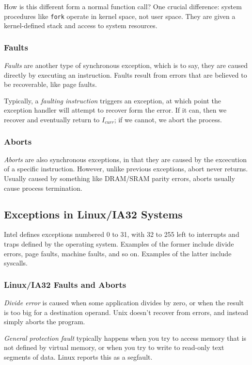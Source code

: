 \documentclass[fleqn]{article}
\begin{document}
How is this different form a normal function call? One crucial difference: system procedures like \texttt{fork} operate in kernel space, not user space. They are given a kernel-defined stack and access to system resources.

\subsubsection*{Faults}

\textit{Faults} are another type of synchronous exception, which is to say, they are caused directly by executing an instruction. Faults result from errors that are believed to be recoverable, like page faults.

Typically, a \textit{faulting instruction} triggers an exception, at which point the exception handler will attempt to recover form the error. If it can, then we recover and eventually return to $I_{curr}$; if we cannot, we abort the process.

\subsubsection*{Aborts}

\textit{Aborts} are also synchronous exceptions, in that they are caused by the excecution of a specific instruction. However, unlike previous exceptions, abort never returns. Usually caused by something like DRAM/SRAM parity errors, aborts usually cause process termination.

\subsection{Exceptions in Linux/IA32 Systems}

Intel defines exceptions numbered 0 to 31, with 32 to 255 left to interrupts and traps defined by the operating system. Examples of the former include divide errors, page faults, machine faults, and so on. Examples of the latter include syscalls.

\subsubsection*{Linux/IA32 Faults and Aborts}

\textit{Divide error} is caused when some application divides by zero, or when the result is too big for a destination operand. Unix doesn't recover from errors, and instead simply aborts the program.

\textit{General protection fault} typically happens when you try to access memory that is not defined by virtual memory, or when you try to write to read-only text segments of data. Linux reports this as a segfault.
\end{document}
